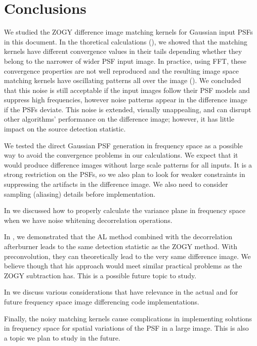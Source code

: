 \documentclass[11pt]{article}
\begin{document}
\section{Conclusions}
%
\par We studied the ZOGY difference image matching kernels for Gaussian
input PSFs in this document. In the thoretical calculations
(), we showed that the matching kernels have different
convergence values in their tails depending whether they belong to the
narrower of wider PSF input image. In practice, using FFT, these convergence
properties are not well reproduced and the resulting image space matching
kernels have oscillating patterns all over the image
(). We concluded that this noise is still acceptable if
the input images follow their PSF models and suppress high frequencies,
however noise patterns appear in the difference image if the PSFs
deviate. This noise is extended, visually unappealing, and can disrupt other
algorithms' performance on the difference image; however, it has little
impact on the source detection statistic.
%
\par We tested the direct Gaussian PSF generation in frequency space as a
possible way to avoid the convergence problems in our calculations. We
expect that it would produce difference images without large scale patterns
for all inputs. It is a strong restriction on the PSFs, so we also plan to
look for weaker constraints in suppressing the artifacts in the difference
image. We also need to consider sampling (aliasing) details before
implementation.
%
\par In  we discussed how to properly calculate the variance
plane in frequency space when we have noise whitening decorrelation
operations.
%
\par In , we demonstrated that the AL method combined with
the decorrelation afterburner leads to the same detection statistic as the
ZOGY method. With preconvolution, they can theoretically lead to the very
same difference image. We believe though that his approach would meet
similar practical problems as the ZOGY subtraction has. This is a possible
future topic to study.
%
\par In  we discuss various considerations that have
relevance in the actual and for future frequency space image differencing
code implementations.
%
\par Finally, the noisy matching kernels cause complications in
implementing solutions in frequency space for spatial variations of the PSF
in a large image. This is also a topic we plan to study in the future.
\end{document}
